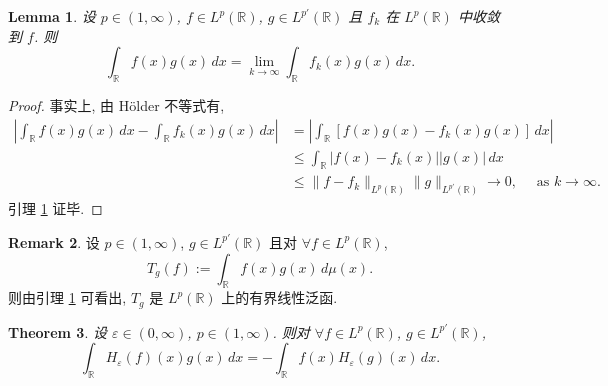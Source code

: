 \documentclass[a4paper,11pt]{article}
\newtheorem{theorem}{Theorem}[section]
\newtheorem{lemma}[theorem]{Lemma}
\theoremstyle{definition}
\newtheorem{remark}[theorem]{Remark}
\begin{document}
\begin{lemma} \label{lem6}
    设 $ p \in (1, \infty) $, $ f \in L^p(\mathbb{R}) $, $ g \in L^{p'}(\mathbb{R}) $
    且 $ f_k $ 在 $ L^p(\mathbb{R}) $ 中收敛到 $ f $. 则 
    $$
        \int_\mathbb{R} f(x) g(x) \, dx 
            = \lim_{k \to \infty} \int_\mathbb{R} f_k(x) g(x) \, dx.
    $$
\end{lemma}

\begin{proof}
    事实上, 由 H\"older 不等式有,
    \begin{align*}
        \left| \int_\mathbb{R} f(x) g(x) \, dx - \int_\mathbb{R} f_k(x) g(x) \, dx \right|
            &= \left| \int_\mathbb{R} [f(x) g(x) - f_k(x) g(x)] \, dx \right| \\
            &\leq \int_\mathbb{R} |f(x) - f_k(x)| |g(x)|  \, dx \\
            &\leq \| f - f_k \|_{L^p(\mathbb{R})} \| g \|_{L^{p'}(\mathbb{R})}
            \to 0, \quad \text{ as } k \to \infty.
    \end{align*}
    引理 \ref{lem6} 证毕. 
\end{proof}

\begin{remark}
    设 $ p \in (1, \infty) $, $ g \in L^{p'}(\mathbb{R}) $ 且对 $ \forall f \in L^p(\mathbb{R}) $,
    $$
        T_g(f) := \int_\mathbb{R} f(x) g(x) \, d\mu(x).
    $$
    则由引理 \ref{lem6} 可看出, $ T_g $ 是 $ L^p(\mathbb{R}) $ 上的有界线性泛函.
\end{remark}

\begin{theorem} \label{thm3}
    设 $ \varepsilon \in (0, \infty) $, $ p \in (1, \infty) $. 
    则对 $ \forall f \in L^p(\mathbb{R}) $, $ g \in L^{p'}(\mathbb{R}) $,
    $$
        \int_\mathbb{R} H_\varepsilon (f)(x) g(x) \, dx
            = -\int_\mathbb{R} f(x) H_\varepsilon (g)(x) \, dx.
    $$
\end{theorem}
\end{document}
